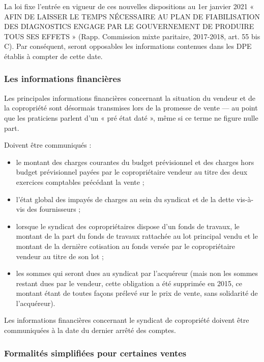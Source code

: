 			La loi fixe l’entrée en vigueur de ces nouvelles dispositions au 1er janvier 2021 « AFIN DE LAISSER LE
			TEMPS NÉCESSAIRE AU PLAN DE FIABILISATION DES DIAGNOSTICS ENGAGE PAR LE GOUVERNEMENT DE
			PRODUIRE TOUS SES EFFETS » (Rapp. Commission mixte paritaire, 2017-2018, art. 55 bis C). Par
			conséquent, seront opposables les informations contenues dans les DPE établis à compter de cette date.
			
		\subsubsection{Les informations financières}
		
			Les principales informations financières concernant la situation du vendeur et de la copropriété sont
			désormais transmises lors de la promesse de vente –-- au point que les praticiens parlent d’un « pré état
			daté », même si ce terme ne figure nulle part.
			
			Doivent être communiqués :
			\begin{itemize}
				\item  le montant des charges courantes du budget prévisionnel et des charges hors budget prévisionnel
				payées par le copropriétaire vendeur au titre des deux exercices comptables précédant la vente ;
				\item  l'état global des impayés de charges au sein du syndicat et de la dette vis-à-vis des fournisseurs ;
				\item  lorsque le syndicat des copropriétaires dispose d'un fonds de travaux, le montant de la part du
				fonds de travaux rattachée au lot principal vendu et le montant de la dernière cotisation au fonds
				versée par le copropriétaire vendeur au titre de son lot ;
				\item  les sommes qui seront dues au syndicat par l'acquéreur (mais non les sommes restant dues par le
				vendeur, cette obligation a été supprimée en 2015, ce montant étant de toutes façons prélevé sur
				le prix de vente, sans solidarité de l’acquéreur).
			\end{itemize}
			
			Les informations financières concernant le syndicat de copropriété doivent être communiquées à la date
			du dernier arrêté des comptes.
			
		\subsubsection{Formalités simplifiées pour certaines ventes}
			
